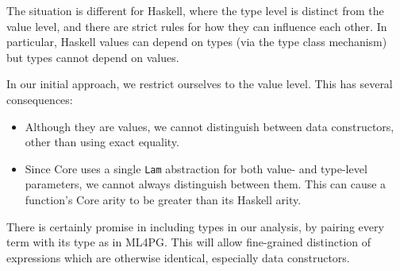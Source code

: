 The situation is different for Haskell, where the type level is distinct from the value level, and there are strict rules for how they can influence each other. In particular, Haskell values can depend on types (via the type class mechanism) but types cannot depend on values.

In our initial approach, we restrict ourselves to the value level. This has several consequences:

\begin{itemize}
  \item Although they are values, we cannot distinguish between data constructors, other than using exact equality.
  \item Since Core uses a single \texttt{Lam} abstraction for both value- and type-level parameters, we cannot always distinguish between them. This can cause a function's Core arity to be greater than its Haskell arity.
\end{itemize}

There is certainly promise in including types in our analysis, by pairing every term with its type as in ML4PG. This will allow fine-grained distinction of expressions which are otherwise identical, especially data constructors.
